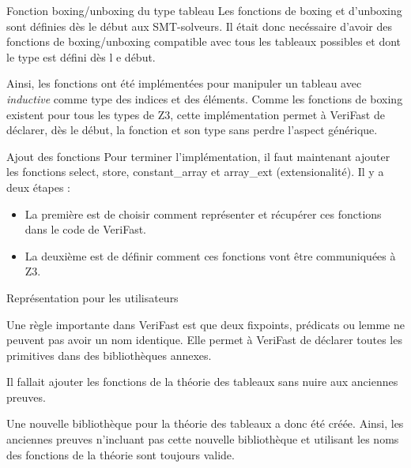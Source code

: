 \documentclass[9pt]{beamer}
\newcommand{\verifast}{VeriFast}
\newcommand{\inductive}{\textit{inductive}}
\begin{document}
\begin{frame}{Fonction boxing/unboxing du type tableau}
Les fonctions de boxing et d'unboxing sont d\'efinies d\`es le d\'ebut aux SMT-solveurs. Il \'etait donc nec\'essaire d'avoir des fonctions de boxing/unboxing compatible avec tous les tableaux possibles et dont le type est d\'efini d\`es l e d\'ebut. 

Ainsi, les fonctions ont \'et\'e impl\'ement\'ees pour manipuler un tableau avec \inductive{} comme type des indices et des \'el\'ements. Comme les fonctions de boxing existent pour tous les types de Z3, cette impl\'ementation permet \`a \verifast{} de d\'eclarer, d\`es le d\'ebut, la fonction et son type sans perdre l'aspect g\'en\'erique.
\end{frame}

\begin{frame}{Ajout des fonctions}
Pour terminer l'impl\'ementation, il faut maintenant ajouter les fonctions select, store, constant\_array et array\_ext (extensionalit\'e). Il y a deux \'etapes : 
	\begin{itemize}
		\item La premi\`ere est de choisir comment repr\'esenter  et r\'ecup\'erer ces fonctions dans le code de \verifast{}. 
		\item La deuxi\`eme est de d\'efinir comment ces fonctions vont \^etre communiqu\'ees \`a Z3.
	\end{itemize}
\end{frame}

\begin{frame}{Repr\'esentation pour les utilisateurs}

	Une r\`egle importante dans \verifast{} est que deux fixpoints, pr\'edicats ou lemme ne peuvent pas avoir un nom identique. Elle permet \`a \verifast{} de d\'eclarer toutes les primitives dans des biblioth\`eques annexes.
	
	Il fallait ajouter les fonctions de la th\'eorie des tableaux sans nuire aux anciennes preuves.  
	
	Une nouvelle biblioth\`eque pour la th\'eorie des tableaux a donc \'et\'e cr\'e\'ee. Ainsi, les anciennes preuves n'incluant pas cette nouvelle biblioth\`eque et utilisant les noms des fonctions de la th\'eorie sont toujours valide.
\end{frame}
\end{document}
